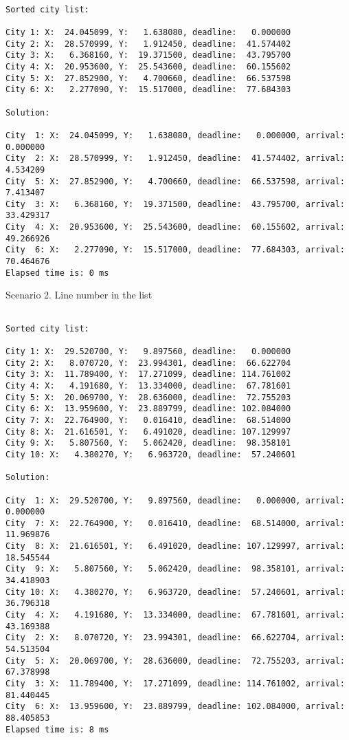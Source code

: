 \documentclass[a4paper, 12pt]{article}
\begin{document}
\begin{lstlisting}

Sorted city list:

City 1: X:  24.045099, Y:   1.638080, deadline:   0.000000
City 2: X:  28.570999, Y:   1.912450, deadline:  41.574402
City 3: X:   6.368160, Y:  19.371500, deadline:  43.795700
City 4: X:  20.953600, Y:  25.543600, deadline:  60.155602
City 5: X:  27.852900, Y:   4.700660, deadline:  66.537598
City 6: X:   2.277090, Y:  15.517000, deadline:  77.684303

Solution: 

City  1: X:  24.045099, Y:   1.638080, deadline:   0.000000, arrival:   0.000000
City  2: X:  28.570999, Y:   1.912450, deadline:  41.574402, arrival:   4.534209
City  5: X:  27.852900, Y:   4.700660, deadline:  66.537598, arrival:   7.413407
City  3: X:   6.368160, Y:  19.371500, deadline:  43.795700, arrival:  33.429317
City  4: X:  20.953600, Y:  25.543600, deadline:  60.155602, arrival:  49.266926
City  6: X:   2.277090, Y:  15.517000, deadline:  77.684303, arrival:  70.464676
Elapsed time is: 0 ms

\end{lstlisting}

Scenario 2. Line number in the list

\begin{lstlisting}

Sorted city list:

City 1: X:  29.520700, Y:   9.897560, deadline:   0.000000
City 2: X:   8.070720, Y:  23.994301, deadline:  66.622704
City 3: X:  11.789400, Y:  17.271099, deadline: 114.761002
City 4: X:   4.191680, Y:  13.334000, deadline:  67.781601
City 5: X:  20.069700, Y:  28.636000, deadline:  72.755203
City 6: X:  13.959600, Y:  23.889799, deadline: 102.084000
City 7: X:  22.764900, Y:   0.016410, deadline:  68.514000
City 8: X:  21.616501, Y:   6.491020, deadline: 107.129997
City 9: X:   5.807560, Y:   5.062420, deadline:  98.358101
City 10: X:   4.380270, Y:   6.963720, deadline:  57.240601

Solution: 

City  1: X:  29.520700, Y:   9.897560, deadline:   0.000000, arrival:   0.000000
City  7: X:  22.764900, Y:   0.016410, deadline:  68.514000, arrival:  11.969876
City  8: X:  21.616501, Y:   6.491020, deadline: 107.129997, arrival:  18.545544
City  9: X:   5.807560, Y:   5.062420, deadline:  98.358101, arrival:  34.418903
City 10: X:   4.380270, Y:   6.963720, deadline:  57.240601, arrival:  36.796318
City  4: X:   4.191680, Y:  13.334000, deadline:  67.781601, arrival:  43.169388
City  2: X:   8.070720, Y:  23.994301, deadline:  66.622704, arrival:  54.513504
City  5: X:  20.069700, Y:  28.636000, deadline:  72.755203, arrival:  67.378998
City  3: X:  11.789400, Y:  17.271099, deadline: 114.761002, arrival:  81.440445
City  6: X:  13.959600, Y:  23.889799, deadline: 102.084000, arrival:  88.405853
Elapsed time is: 8 ms



\end{lstlisting}
\end{document}
